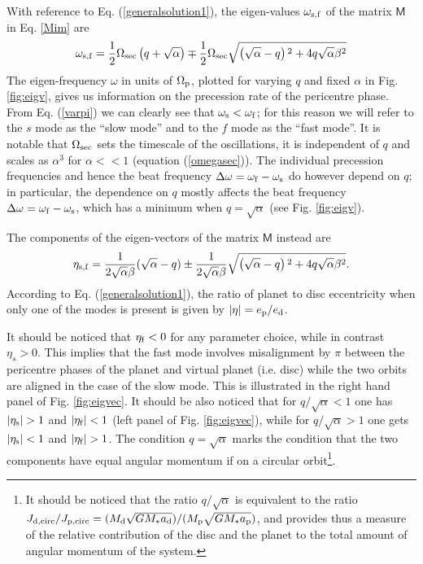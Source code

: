 \documentclass[usenatbib,a4paper,times,fleqn]{mnras}
\begin{document}
With reference to Eq. (\ref{generalsolution1}), the eigen-values $\omega_{\rm s,f}$ of the matrix $\bm{\mathsf{M}}$ in Eq. \ref{Mim} are
\begin{equation}
\omega_{\rm s,f}= \frac{1}{2}\Omega_{\rm sec} \left(q+\sqrt\alpha\right)\mp \frac{1}{2}\Omega_{\rm sec}\sqrt{ \left(\sqrt\alpha-q\right){}^2+4 q\sqrt{\alpha}\beta^2}\label{varpi}
\end{equation}
The eigen-frequency $\omega$ in units of $\Omega_{\rm p}$, plotted for varying $q$ and fixed $\alpha$ in Fig. \ref{fig:eigv}, gives us information on the precession rate of the pericentre phase. From Eq. (\ref{varpi}) we can clearly see that $\omega_{\rm s}<\omega_{\rm f}$; for this reason we will refer to the $s$ mode as the ``slow mode'' and to the $f$ mode as the ``fast mode''. It is notable that $\Omega_{\rm sec}$ sets the timescale of the oscillations, it is independent of $q$ and scales as $\alpha^3$ for $\alpha << 1$ (equation (\ref{omegasec})). The individual precession frequencies and hence the beat frequency $\Delta \omega = \omega_{\rm f} - \omega_{\rm s}$ do however depend on $q$; in particular, the dependence on $q$ mostly affects the beat frequency $\Delta\omega=\omega_{\rm f}-\omega_{\rm s}$, which has a minimum when $q=\sqrt{\alpha}$ (see Fig. \ref{fig:eigv}). 

The components of the eigen-vectors of the matrix $\bm {\mathsf{M}}$ instead are
\begin{equation}
\eta_{\rm s,f}=    \frac{1}{2\sqrt{\alpha}\beta}( \sqrt{\alpha}-q)\pm \frac{1}{2\sqrt{\alpha}\beta}\sqrt{ \left(\sqrt{\alpha}-q\right){}^2+4 q\sqrt{\alpha}\beta^2}.\label{reigv}
\end{equation}
According to Eq. (\ref{generalsolution1}), the ratio of planet to disc eccentricity when only one of the modes is present is given by $|\eta|=e_{\rm p}/e_{\rm d}$.

It should be noticed that $\eta_{\rm f}<0$ for any parameter choice, while in contrast $\eta_s>0$.
This implies that the fast mode involves misalignment by $\pi$ between the pericentre phases of the planet and virtual planet (i.e. disc)
while the two orbits are aligned in the case of the slow mode. This is illustrated in the right hand panel of Fig. \ref{fig:eigvec}. It should be also noticed that for $q/\sqrt \alpha<1$ one has $|\eta_{\rm s}|>1$ and $|\eta_{\rm f}|<1$ (left panel of Fig. \ref{fig:eigvec}), while for $q/\sqrt \alpha>1$ one gets $|\eta_{\rm s}|<1$ and $|\eta_{\rm f}|>1$. The condition $q = \sqrt{\alpha}$ marks the condition that the two components have equal angular momentum if on a circular orbit\footnote{It should be noticed that the ratio $q/\sqrt{\alpha}$ is equivalent to the ratio $J_{\rm d,circ}/J_{\rm p,circ}=(M_{\rm d}\sqrt{GM_\ast a_{\rm d}})/(M_{\rm p}\sqrt{GM_\ast a_{\rm p}})$, and provides thus a measure of the relative contribution of the disc and the planet to the total amount of angular momentum of the system.\label{qsqrta}}.
\end{document}
